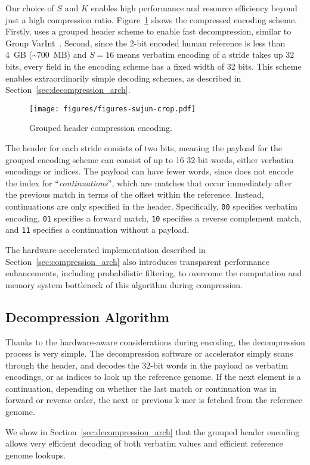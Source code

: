 Our choice of $S$ and $K$ enables high performance and resource efficiency beyond just a high compression ratio.
Figure~\ref{fig:compressed_format} shows the compressed encoding scheme.
Firstly, \name{} uses a grouped header scheme to enable fast decompression, similar to Group VarInt~\cite{dean2009challengesgroupvarint}.
Second, since the 2-bit encoded human reference is less than 4~GB (\textasciitilde 700~MB) and $S=16$ means verbatim encoding of a stride takes up 32 bits, every field in the encoding scheme has a fixed width of 32 bits.
This scheme enables extraordinarily simple decoding schemes, as described in Section~\ref{sec:decompression_arch}.

\begin{figure}[htb]
    \centering
    \texttt{[image: figures/figures-swjun-crop.pdf]}
    \caption{Grouped header compression encoding.}
    \label{fig:compressed_format}
\end{figure}

The header for each stride consists of two bits, meaning the payload for the grouped encoding scheme can consist of up to 16 32-bit words, either verbatim encodings or indices.
The payload can have fewer words, since \name{} does not encode the index for ``\emph{continuations}'', which are matches that occur immediately after the previous match in terms of the offset within the reference.
Instead, continuations are only specified in the header.
Specifically, \texttt{00} specifies verbatim encoding, \texttt{01} specifies a forward match, \texttt{10} specifies a reverse complement match, and \texttt{11} specifies a continuation without a payload.

The hardware-accelerated implementation described in Section~\ref{sec:compression_arch} also introduces transparent performance enhancements, including probabilistic filtering, to overcome the computation and memory system bottleneck of this algorithm during compression.


\subsection{Decompression Algorithm}

Thanks to the hardware-aware considerations during encoding, the decompression process is very simple.
The decompression software or accelerator simply scans through the header, and decodes the 32-bit words in the payload as verbatim encodings, or as indices to look up the reference genome.
If the next element is a continuation, depending on whether the last match or continuation was in forward or reverse order, the next or previous k-mer is fetched from the reference genome.

We show in Section~\ref{sec:decompression_arch} that the grouped header encoding allows very efficient decoding of both verbatim values and efficient reference genome lookups.


